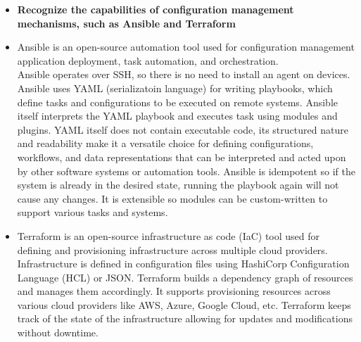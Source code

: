 \documentclass{article}
\begin{document}
\begin{itemize}
  \item \textbf{Recognize the capabilities of configuration management mechanisms, such as Ansible and Terraform}
  	\item[] Ansible is an open-source automation tool used for configuration management application deployment, task automation, and orchestration.\\
			Ansible operates over SSH, so there is no need to install an agent on devices. Ansible uses YAML (serializatoin language) for writing playbooks, which define tasks and configurations to be executed on remote systems. Ansible itself interprets the YAML playbook and executes task using modules and plugins. YAML itself does not contain executable code, its structured nature and readability make it a versatile choice for defining configurations, workflows, and data representations that can be interpreted and acted upon by other software systems or automation tools. Ansible is idempotent so if the system is already in the desired state, running the playbook again will not cause any changes. It is extensible so modules can be custom-written to support various tasks and systems.
	\item[] Terraform is an open-source infrastructure as code (IaC) tool used for defining and provisioning infrastructure across multiple cloud providers.\\
			Infrastructure is defined in configuration files using HashiCorp Configuration Language (HCL) or JSON. Terraform builds a dependency graph of resources and manages them accordingly. It supports provisioning resources across various cloud providers like AWS, Azure, Google Cloud, etc. Terraform keeps track of the state of the infrastructure allowing for updates and modifications without downtime.
  

\end{itemize}
\end{document}
